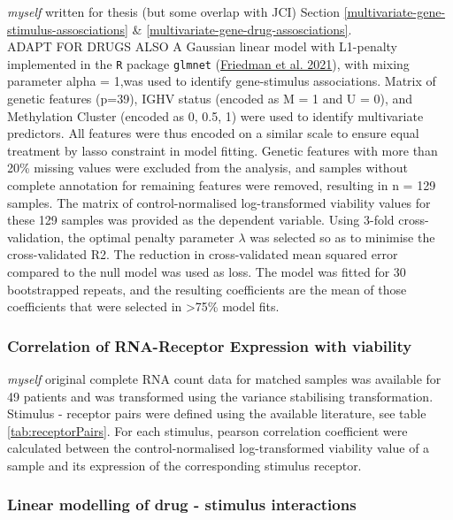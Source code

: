 \documentclass[11pt, a4paper, twosided]{book}
\begin{document}
\emph{myself} written for thesis (but some overlap with JCI)
Section \ref{multivariate-gene-stimulus-assosciations} \& \ref{multivariate-gene-drug-assosciations}.\\
ADAPT FOR DRUGS ALSO A Gaussian linear model with L1-penalty implemented in the \texttt{R} package \texttt{glmnet} (\protect\hyperlink{ref-R-glmnet}{Friedman et al. 2021}), with mixing parameter alpha = 1,was used to identify gene-stimulus associations. Matrix of genetic features (p=39), IGHV status (encoded as M = 1 and U = 0), and Methylation Cluster (encoded as 0, 0.5, 1) were used to identify multivariate predictors. All features were thus encoded on a similar scale to ensure equal treatment by lasso constraint in model fitting. Genetic features with more than 20\% missing values were excluded from the analysis, and samples without complete annotation for remaining features were removed, resulting in n = 129 samples. The matrix of control-normalised log-transformed viability values for these 129 samples was provided as the dependent variable. Using 3-fold cross-validation, the optimal penalty parameter \(\lambda\) was selected so as to minimise the cross-validated R2. The reduction in cross-validated mean squared error compared to the null model was used as loss. The model was fitted for 30 bootstrapped repeats, and the resulting coefficients are the mean of those coefficients that were selected in \textgreater75\% model fits.

\hypertarget{correlation-of-rna-receptor-expression-with-viability}{%
\subsubsection{Correlation of RNA-Receptor Expression with viability}\label{correlation-of-rna-receptor-expression-with-viability}}

\emph{myself} original complete
RNA count data for matched samples was available for 49 patients and was transformed using the variance stabilising transformation. Stimulus - receptor pairs were defined using the available literature, see table \ref{tab:receptorPairs}. For each stimulus, pearson correlation coefficient were calculated between the control-normalised log-transformed viability value of a sample and its expression of the corresponding stimulus receptor.

\hypertarget{drug-stimulus-linear-model-method}{%
\subsubsection{Linear modelling of drug - stimulus interactions}\label{drug-stimulus-linear-model-method}}
\end{document}
